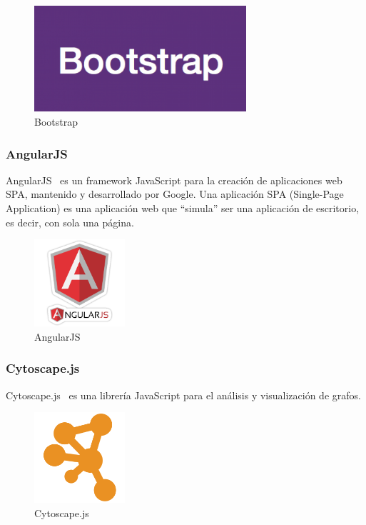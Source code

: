 \begin{figure}[tbh]
\centering
\label{fig:bootstrap}
\includegraphics[width=0.7\textwidth]{imagenes/bootstrap}
\caption{Bootstrap}
\end{figure}

\subsubsection*{AngularJS}
AngularJS~\cite{angular} es un framework JavaScript para la creación de aplicaciones web SPA, mantenido y desarrollado por Google. Una aplicación SPA (Single-Page Application) es una aplicación web que ``simula'' ser una aplicación de escritorio, es decir, con sola una página.

\begin{figure}[tbh]
\centering
\label{fig:angular}
\includegraphics[width=0.3\textwidth]{imagenes/angular}
\caption{AngularJS}
\end{figure}

\subsubsection*{Cytoscape.js}

Cytoscape.js~\cite{cytoscape} es una librería JavaScript para el análisis y visualización de grafos.

\begin{figure}[tbh]
\centering
\label{fig:cytoscape}
\includegraphics[width=0.3\textwidth]{imagenes/cytoscape}
\caption{Cytoscape.js}
\end{figure}

